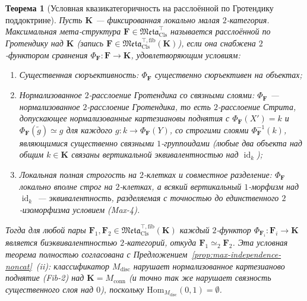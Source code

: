 \documentclass[11pt]{article}
\theoremstyle{plain}
\newtheorem{theorem}{Теорема}[section]
\theoremstyle{definition}
\newcommand{\Meta}{\mathfrak{Meta}}
\newcommand{\Hom}{\mathrm{Hom}}
\DeclareMathOperator{\id}{id}
\begin{document}
\begin{theorem}[Условная квазикатегоричность на расслоённой по Гротендику поддоктрине]\label{thm:meta-cat-fib}
Пусть $\mathbf{K}$ — фиксированная локально малая $2$-категория. Максимальная мета-структура $\mathbf{F} \in \Meta_{\mathrm{Cls}}^{\top}$ называется \emph{расслоённой по Гротендику над $\mathbf{K}$} (запись $\mathbf{F} \in \Meta_{\mathrm{Cls}}^{\top,\mathrm{fib}}(\mathbf{K})$), если она снабжена $2$-функтором сравнения $\Phi_{\mathbf{F}} : \mathbf{F} \to \mathbf{K}$, удовлетворяющим условиям:
\begin{enumerate}[nosep,label=\textup{(Fib-\arabic*)}]
\item \emph{Существенная сюръективность}: $\Phi_{\mathbf{F}}$ существенно сюръективен на объектах;
\item \emph{Нормализованное $2$-расслоение Гротендика со связными слоями}: $\Phi_{\mathbf{F}}$ — нормализованное $2$-расслоение Гротендика, то есть $2$-расслоение Стрита, допускающее нормализованные картезиановы поднятия с $\Phi_{\mathbf{F}}(X') = k$ и $\Phi_{\mathbf{F}}(\tilde{g}) \simeq g$ для каждого $g : k \to \Phi_{\mathbf{F}}(Y)$, со строгими слоями $\Phi_{\mathbf{F}}^{-1}(k)$, являющимися существенно связными $1$-группоидами (любые два объекта над общим $k \in \mathbf{K}$ связаны вертикальной эквивалентностью над $\id_k$);
\item \emph{Локальная полная строгость на $2$-клетках и совместное разделение}: $\Phi_{\mathbf{F}}$ локально вполне строг на $2$-клетках, а всякий вертикальный $1$-морфизм над $\id_k$ — эквивалентность, разделяемая с точностью до единственного $2$-изоморфизма условием \textup{(Max-4)}.
\end{enumerate}
Тогда для любой пары $\mathbf{F}_1, \mathbf{F}_2 \in \Meta_{\mathrm{Cls}}^{\top,\mathrm{fib}}(\mathbf{K})$ каждый $2$-функтор $\Phi_{\mathbf{F}_i} : \mathbf{F}_i \to \mathbf{K}$ является биэквивалентностью $2$-категорий, откуда $\mathbf{F}_1 \simeq_2 \mathbf{F}_2$. Эта условная теорема полностью согласована с Предложением~\ref{prop:max-independence-noncat}~(ii): классификатор $M_{\mathrm{disc}}$ нарушает нормализованное картезианово поднятие \textup{(Fib-2)} над $\mathbf{K} = M_{\mathrm{conn}}$ (и точно так же нарушает связность существенного слоя над $0$), поскольку $\Hom_{M_{\mathrm{disc}}}(0, 1) = \emptyset$.
\end{theorem}
\end{document}
